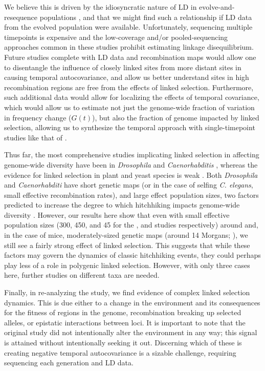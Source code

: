\documentclass[11pt]{article}
\begin{document}
We believe this is driven by the idiosyncratic nature of LD in
evolve-and-resequence populations \parencite{Nuzhdin2013-gf,Kelly2019-dc}, and
that we might find such a relationship if LD data from the evolved population
were available. Unfortunately, sequencing multiple timepoints is expensive and
the low-coverage and/or pooled-sequencing approaches common in these studies
prohibit estimating linkage disequilibrium. Future studies complete with LD
data and recombination maps would allow one to disentangle the influence of
closely linked sites from more distant sites in causing temporal
autocovariance, and allow us better understand sites in high recombination
regions are free from the effects of linked selection. Furthermore, such
additional data would allow for localizing the effects of temporal covariance,
which would allow us to estimate not just the genome-wide fraction of variation
in frequency change ($G(t)$), but also the fraction of genome impacted by
linked selection, allowing us to synthesize the temporal approach with
single-timepoint studies like that of \textcite{Elyashiv2016-vt}.


Thus far, the most comprehensive studies implicating linked selection in
affecting genome-wide diversity have been in \emph{Drosophila}
\parencite{Begun1992-ey,Elyashiv2016-vt,Sattath2011-dr} and
\emph{Caenorhabditis} \cite{Cutter2003-tl,Cutter2003-tl,Andersen2012-bj},
whereas the evidence for linked selection in plant and yeast species is weak
\parencite{Cutter2013-ba}. Both \emph{Drosophila} and \emph{Caenorhabditi} have
short genetic maps (or in the case of selfing \emph{C.  elegans}, small
effective recombination rates), and large effect population sizes, two factors
predicted to increase the degree to which hitchhiking impacts genome-wide
diversity \parencite{Barton2000-zg}. However, our results here show that even
with small effective population sizes (300, 450, and 45 for the
\textcite{Kelly2019-dc}, and \textcite{Castro2019-uk} studies respectively)
around and, in the case of mice, moderately-sized genetic maps (around 14
Morgans; \cite{Cox2009-hf}), we still see a fairly strong effect of linked
selection. This suggests that while these factors may govern the dynamics of
classic hitchhiking events, they could perhaps play less of a role in polygenic
linked selection. However, with only three cases here, further studies on
different taxa are needed.

Finally, in re-analyzing the \textcite{Barghi2019-qy} study, we find evidence
of complex linked selection dynamics. This is due either to a change in the
environment and its consequences for the fitness of regions in the genome,
recombination breaking up selected alleles, or epistatic interactions between
loci. It is important to note that the original study did not intentionally
alter the environment in any way; this signal is attained without intentionally
seeking it out. Discerning which of these is creating negative temporal
autocovariance is a sizable challenge, requiring sequencing each generation and
LD data.
\end{document}
